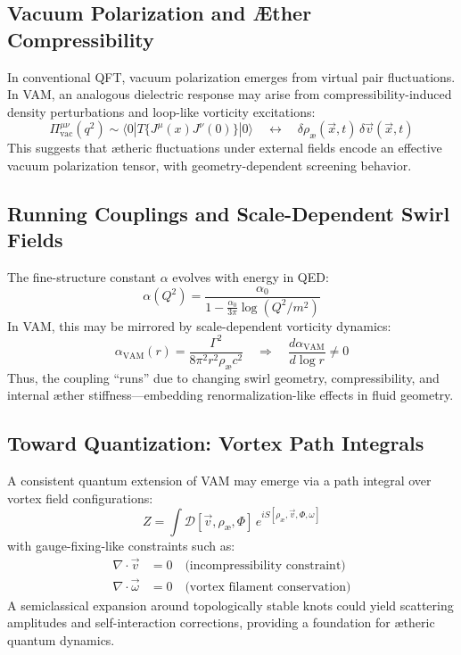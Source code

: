 \subsection{Vacuum Polarization and Æther Compressibility}

In conventional QFT, vacuum polarization emerges from virtual pair fluctuations. In VAM, an analogous dielectric response may arise from compressibility-induced density perturbations and loop-like vorticity excitations:
\begin{equation}
    \Pi^{\mu\nu}_{\text{vac}}(q^2) \sim \langle 0 | T\{J^\mu(x) J^\nu(0)\} | 0 \rangle
    \quad \longleftrightarrow \quad
    \delta \rho_\text{\ae}(\vec{x}, t) \, \delta \vec{v}(\vec{x}, t)
\end{equation}
This suggests that ætheric fluctuations under external fields encode an effective vacuum polarization tensor, with geometry-dependent screening behavior.

\subsection{Running Couplings and Scale-Dependent Swirl Fields}

The fine-structure constant \( \alpha \) evolves with energy in QED:
\begin{equation}
    \alpha(Q^2) = \frac{\alpha_0}{1 - \frac{\alpha_0}{3\pi} \log(Q^2 / m^2)}
\end{equation}
In VAM, this may be mirrored by scale-dependent vorticity dynamics:
\begin{equation}
    \alpha_{\text{VAM}}(r) = \frac{\Gamma^2}{8\pi^2 r^2 \rho_\text{\ae} c^2}
    \quad \Rightarrow \quad
    \frac{d\alpha_{\text{VAM}}}{d \log r} \neq 0
\end{equation}
Thus, the coupling “runs” due to changing swirl geometry, compressibility, and internal æther stiffness—embedding renormalization-like effects in fluid geometry.

\subsection{Toward Quantization: Vortex Path Integrals}

A consistent quantum extension of VAM may emerge via a path integral over vortex field configurations:
\begin{equation}
    Z = \int \mathcal{D}[\vec{v}, \rho_\text{\ae}, \Phi] \, e^{i S[\rho_\text{\ae}, \vec{v}, \Phi, \omega]}
\end{equation}
with gauge-fixing-like constraints such as:
\begin{align*}
    \nabla \cdot \vec{v} &= 0 \quad \text{(incompressibility constraint)} \\
    \nabla \cdot \vec{\omega} &= 0 \quad \text{(vortex filament conservation)}
\end{align*}
A semiclassical expansion around topologically stable knots could yield scattering amplitudes and self-interaction corrections, providing a foundation for ætheric quantum dynamics.

